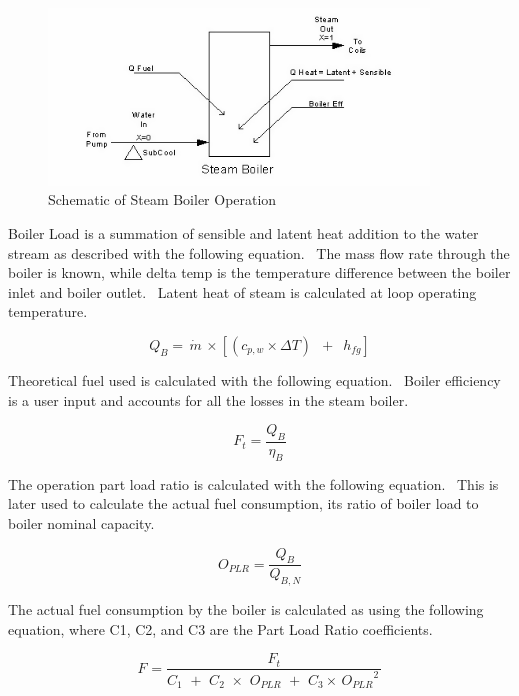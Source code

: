 \begin{figure}[hbtp] %
\centering
\includegraphics[width=0.9\textwidth, height=0.9\textheight, keepaspectratio=true]{media/image2933.png}
\caption{  Schematic of Steam Boiler Operation \protect \label{fig:schematic-of-steam-boiler-operation}}
\end{figure}

Boiler Load is a summation of sensible and latent heat addition to the water stream as described with the following equation.~ The mass flow rate through the boiler is known, while delta temp is the temperature difference between the boiler inlet and boiler outlet.~ Latent heat of steam is calculated at loop operating temperature.

\begin{equation}
{Q_B} = \,\dot m\, \times \left[ {({c_{p,w}} \times \Delta T)\,\,\, + \,\,\,{h_{fg}}} \right]
\end{equation}

Theoretical fuel used is calculated with the following equation.~ Boiler efficiency is a user input and accounts for all the losses in the steam boiler.

\begin{equation}
{F_t} = \frac{{{Q_B}}}{{{\eta_B}}}
\end{equation}

The operation part load ratio is calculated with the following equation.~ This is later used to calculate the actual fuel consumption, its ratio of boiler load to boiler nominal capacity.

\begin{equation}
{O_{PLR}} = \frac{{{Q_B}}}{{{Q_{B,N}}}}
\end{equation}

The actual fuel consumption by the boiler is calculated as using the following equation, where C1, C2, and C3 are the Part Load Ratio coefficients.

\begin{equation}
{F_{}} = \frac{{{F_t}}}{{{C_1}\,\, + \,\,{C_2}\,\, \times \,\,{O_{PLR}}\,\, + \,\,{C_3} \times \,{O_{PLR}}^2\,}}
\end{equation}

